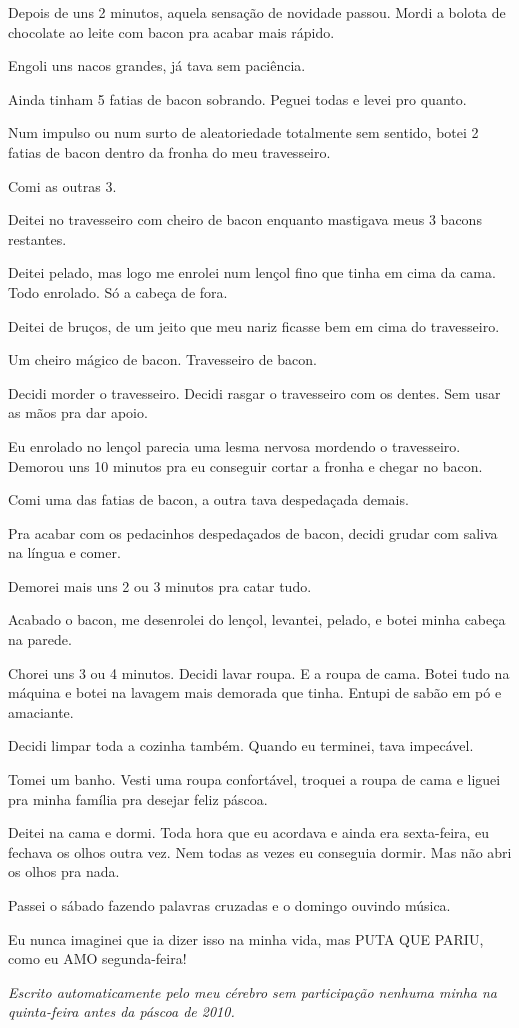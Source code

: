 Depois de uns 2 minutos, aquela sensação de novidade passou. Mordi a bolota de chocolate ao leite com bacon pra acabar mais rápido.

Engoli uns nacos grandes, já tava sem paciência.

Ainda tinham 5 fatias de bacon sobrando. Peguei todas e levei pro quanto.

Num impulso ou num surto de aleatoriedade totalmente sem sentido, botei 2 fatias de bacon dentro da fronha do meu travesseiro.

Comi as outras 3.

Deitei no travesseiro com cheiro de bacon enquanto mastigava meus 3 bacons restantes.

Deitei pelado, mas logo me enrolei num lençol fino que tinha em cima da cama. Todo enrolado. Só a cabeça de fora.

Deitei de bruços, de um jeito que meu nariz ficasse bem em cima do travesseiro.

Um cheiro mágico de bacon. Travesseiro de bacon.

Decidi morder o travesseiro. Decidi rasgar o travesseiro com os dentes. Sem usar as mãos pra dar apoio.

Eu enrolado no lençol parecia uma lesma nervosa mordendo o travesseiro. Demorou uns 10 minutos pra eu conseguir cortar a fronha e chegar no bacon.

Comi uma das fatias de bacon, a outra tava despedaçada demais.

Pra acabar com os pedacinhos despedaçados de bacon, decidi grudar com saliva na língua e comer.

Demorei mais uns 2 ou 3 minutos pra catar tudo.

Acabado o bacon, me desenrolei do lençol, levantei, pelado, e botei minha cabeça na parede.

Chorei uns 3 ou 4 minutos. Decidi lavar roupa. E a roupa de cama. Botei tudo na máquina e botei na lavagem mais demorada que tinha. Entupi de sabão em pó e amaciante.

Decidi limpar toda a cozinha também. Quando eu terminei, tava impecável.

Tomei um banho. Vesti uma roupa confortável, troquei a roupa de cama e liguei pra minha família pra desejar feliz páscoa.

Deitei na cama e dormi. Toda hora que eu acordava e ainda era sexta-feira, eu fechava os olhos outra vez. Nem todas as vezes eu conseguia dormir. Mas não abri os olhos pra nada.

Passei o sábado fazendo palavras cruzadas e o domingo ouvindo música.

Eu nunca imaginei que ia dizer isso na minha vida, mas PUTA QUE PARIU, como eu AMO segunda-feira!



	\begin{center}
	\emph{Escrito automaticamente pelo meu cérebro sem participação nenhuma minha na quinta-feira antes da páscoa de 2010.}
	\end{center}
